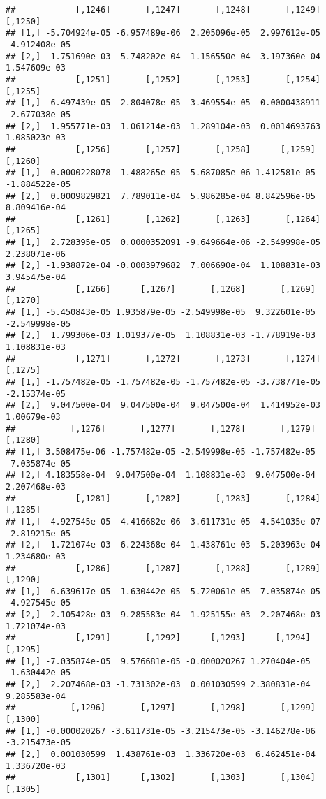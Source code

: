 \documentclass[
]{article}
\begin{document}
\begin{verbatim}
##            [,1246]       [,1247]       [,1248]       [,1249]       [,1250]
## [1,] -5.704924e-05 -6.957489e-06  2.205096e-05  2.997612e-05 -4.912408e-05
## [2,]  1.751690e-03  5.748202e-04 -1.156550e-04 -3.197360e-04  1.547609e-03
##            [,1251]       [,1252]       [,1253]       [,1254]       [,1255]
## [1,] -6.497439e-05 -2.804078e-05 -3.469554e-05 -0.0000438911 -2.677038e-05
## [2,]  1.955771e-03  1.061214e-03  1.289104e-03  0.0014693763  1.085023e-03
##            [,1256]       [,1257]       [,1258]      [,1259]       [,1260]
## [1,] -0.0000228078 -1.488265e-05 -5.687085e-06 1.412581e-05 -1.884522e-05
## [2,]  0.0009829821  7.789011e-04  5.986285e-04 8.842596e-05  8.809416e-04
##            [,1261]       [,1262]       [,1263]       [,1264]      [,1265]
## [1,]  2.728395e-05  0.0000352091 -9.649664e-06 -2.549998e-05 2.238071e-06
## [2,] -1.938872e-04 -0.0003979682  7.006690e-04  1.108831e-03 3.945475e-04
##            [,1266]      [,1267]       [,1268]       [,1269]       [,1270]
## [1,] -5.450843e-05 1.935879e-05 -2.549998e-05  9.322601e-05 -2.549998e-05
## [2,]  1.799306e-03 1.019377e-05  1.108831e-03 -1.778919e-03  1.108831e-03
##            [,1271]       [,1272]       [,1273]       [,1274]      [,1275]
## [1,] -1.757482e-05 -1.757482e-05 -1.757482e-05 -3.738771e-05 -2.15374e-05
## [2,]  9.047500e-04  9.047500e-04  9.047500e-04  1.414952e-03  1.00679e-03
##           [,1276]       [,1277]       [,1278]       [,1279]       [,1280]
## [1,] 3.508475e-06 -1.757482e-05 -2.549998e-05 -1.757482e-05 -7.035874e-05
## [2,] 4.183558e-04  9.047500e-04  1.108831e-03  9.047500e-04  2.207468e-03
##            [,1281]       [,1282]       [,1283]       [,1284]       [,1285]
## [1,] -4.927545e-05 -4.416682e-06 -3.611731e-05 -4.541035e-07 -2.819215e-05
## [2,]  1.721074e-03  6.224368e-04  1.438761e-03  5.203963e-04  1.234680e-03
##            [,1286]       [,1287]       [,1288]       [,1289]       [,1290]
## [1,] -6.639617e-05 -1.630442e-05 -5.720061e-05 -7.035874e-05 -4.927545e-05
## [2,]  2.105428e-03  9.285583e-04  1.925155e-03  2.207468e-03  1.721074e-03
##            [,1291]       [,1292]      [,1293]      [,1294]       [,1295]
## [1,] -7.035874e-05  9.576681e-05 -0.000020267 1.270404e-05 -1.630442e-05
## [2,]  2.207468e-03 -1.731302e-03  0.001030599 2.380831e-04  9.285583e-04
##           [,1296]       [,1297]       [,1298]       [,1299]       [,1300]
## [1,] -0.000020267 -3.611731e-05 -3.215473e-05 -3.146278e-06 -3.215473e-05
## [2,]  0.001030599  1.438761e-03  1.336720e-03  6.462451e-04  1.336720e-03
##            [,1301]      [,1302]       [,1303]       [,1304]       [,1305]

\end{verbatim}
\end{document}
